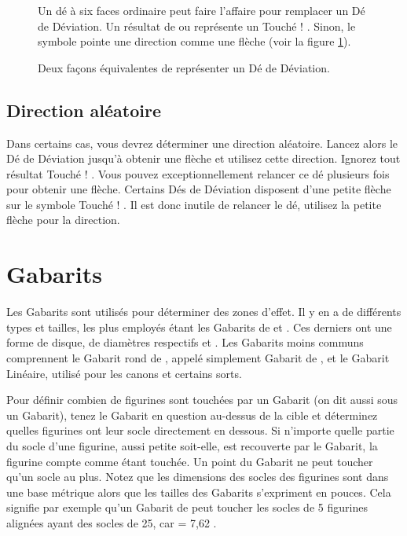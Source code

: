 \begin{figure}[!htbp]
\begin{minipage}[c]{0.67\textwidth}
\vspace*{10pt}
\subsubsection{}

Un dé à six faces ordinaire peut faire l'affaire pour remplacer un Dé de Déviation. Un résultat de  ou  représente un \og Touché ! \fg . Sinon, le symbole  pointe une direction comme une flèche (voir la figure \ref{figure/deviation_dice}).
\end{minipage}
\caption{Deux façons équivalentes de représenter un Dé de Déviation.}
\label{figure/deviation_dice}
\end{figure}

\subsection{Direction aléatoire}

Dans certains cas, vous devrez déterminer une direction aléatoire. Lancez alors le Dé de Déviation jusqu'à obtenir une flèche et utilisez cette direction. Ignorez tout résultat \og Touché ! \fg{}. Vous pouvez exceptionnellement relancer ce dé plusieurs fois pour obtenir une flèche. Certains Dés de Déviation disposent d'une petite flèche sur le symbole \og Touché ! \fg{}. Il est donc inutile de relancer le dé, utilisez la petite flèche pour la direction.

\section{Gabarits}

Les Gabarits sont utilisés pour déterminer des zones d'effet. Il y en a de différents types et tailles, les plus employés étant les Gabarits de  et . Ces derniers ont une forme de disque, de diamètres respectifs  et . Les Gabarits moins communs comprennent le Gabarit rond de , appelé simplement Gabarit de , et le Gabarit Linéaire, utilisé pour les canons et certains sorts.

Pour définir combien de figurines sont touchées par un Gabarit (on dit aussi sous un Gabarit), tenez le Gabarit en question au-dessus de la cible et déterminez quelles figurines ont leur socle directement en dessous. Si n'importe quelle partie du socle d'une figurine, aussi petite soit-elle, est recouverte par le Gabarit, la figurine compte comme étant touchée. Un point du Gabarit ne peut toucher qu'un socle au plus. Notez que les dimensions des socles des figurines sont dans une base métrique alors que les tailles des Gabarits s'expriment en pouces. Cela signifie par exemple qu'un Gabarit de  peut toucher les socles de 5 figurines alignées ayant des socles de \unit{25}{\milli\meter}, car  = 7,62 {\centi\meter}.

